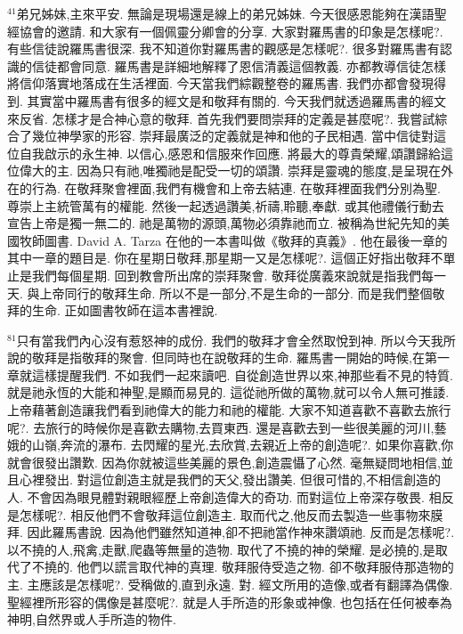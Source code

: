 \documentclass{book}
\begin{document}
$^{41}$弟兄姊妹,主來平安.
無論是現場還是線上的弟兄姊妹.
今天很感恩能夠在漢語聖經協會的邀請.
和大家有一個佩靈分卿會的分享.
大家對羅馬書的印象是怎樣呢?.
有些信徒說羅馬書很深.
我不知道你對羅馬書的觀感是怎樣呢?.
很多對羅馬書有認識的信徒都會同意.
羅馬書是詳細地解釋了恩信清義這個教義.
亦都教導信徒怎樣將信仰落實地落成在生活裡面.
今天當我們綜觀整卷的羅馬書.
我們亦都會發現得到.
其實當中羅馬書有很多的經文是和敬拜有關的.
今天我們就透過羅馬書的經文來反省.
怎樣才是合神心意的敬拜.
首先我們要問崇拜的定義是甚麼呢?.
我嘗試綜合了幾位神學家的形容.
崇拜最廣泛的定義就是神和他的子民相遇.
當中信徒對這位自我啟示的永生神.
以信心,感恩和信服來作回應.
將最大的尊貴榮耀,頌讚歸給這位偉大的主.
因為只有祂,唯獨祂是配受一切的頌讚.
崇拜是靈魂的態度,是呈現在外在的行為.
在敬拜聚會裡面,我們有機會和上帝去結連.
在敬拜裡面我們分別為聖.
尊崇上主統管萬有的權能.
然後一起透過讚美,祈禱,聆聽,奉獻.
或其他禮儀行動去宣告上帝是獨一無二的.
祂是萬物的源頭,萬物必須靠祂而立.
被稱為世紀先知的美國牧師圖書.
David A. Tarza 在他的一本書叫做《敬拜的真義》.
他在最後一章的其中一章的題目是.
你在星期日敬拜,那星期一又是怎樣呢?.
這個正好指出敬拜不單止是我們每個星期.
回到教會所出席的崇拜聚會.
敬拜從廣義來說就是指我們每一天.
與上帝同行的敬拜生命.
所以不是一部分,不是生命的一部分.
而是我們整個敬拜的生命.
正如圖書牧師在這本書裡說.

$^{81}$只有當我們內心沒有惹怒神的成份.
我們的敬拜才會全然取悅到神.
所以今天我所說的敬拜是指敬拜的聚會.
但同時也在說敬拜的生命.
羅馬書一開始的時候,在第一章就這樣提醒我們.
不如我們一起來讀吧.
自從創造世界以來,神那些看不見的特質.
就是祂永恆的大能和神聖,是顯而易見的.
這從祂所做的萬物,就可以令人無可推諉.
上帝藉著創造讓我們看到祂偉大的能力和祂的權能.
大家不知道喜歡不喜歡去旅行呢?.
去旅行的時候你是喜歡去購物,去買東西.
還是喜歡去到一些很美麗的河川,藝娥的山嶺,奔流的瀑布.
去閃耀的星光,去欣賞,去親近上帝的創造呢?.
如果你喜歡,你就會很發出讚歎.
因為你就被這些美麗的景色,創造震懾了心然.
毫無疑問地相信,並且心裡發出.
對這位創造主就是我們的天父,發出讚美.
但很可惜的,不相信創造的人.
不會因為眼見體對親眼經歷上帝創造偉大的奇功.
而對這位上帝深存敬畏.
相反是怎樣呢?.
相反他們不會敬拜這位創造主.
取而代之,他反而去製造一些事物來膜拜.
因此羅馬書說.
因為他們雖然知道神,卻不把祂當作神來讚頌祂.
反而是怎樣呢?.
以不撓的人,飛禽,走獸,爬蟲等無量的造物.
取代了不撓的神的榮耀.
是必撓的,是取代了不撓的.
他們以謊言取代神的真理.
敬拜服侍受造之物.
卻不敬拜服侍那造物的主.
主應該是怎樣呢?.
受稱做的,直到永遠.
對.
經文所用的造像,或者有翻譯為偶像.
聖經裡所形容的偶像是甚麼呢?.
就是人手所造的形象或神像.
也包括在任何被奉為神明,自然界或人手所造的物件.
\end{document}
